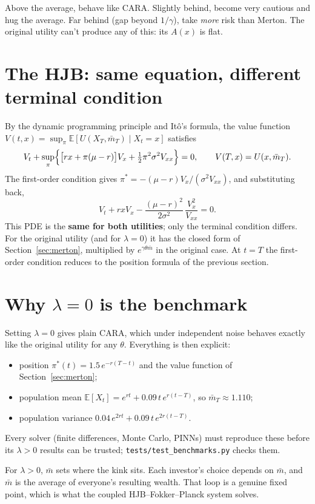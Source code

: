 \documentclass[11pt]{article}
\newcommand{\E}{\mathbb{E}}
\newcommand{\mb}{\bar m}
\begin{document}
\begin{keyidea}
Above the average, behave like CARA. Slightly behind, become very cautious and hug the
average. Far behind (gap beyond $1/\gamma$), take \emph{more} risk than Merton. The
original utility can't produce any of this: its $A(x)$ is flat.
\end{keyidea}

\section{The HJB: same equation, different terminal condition}

By the dynamic programming principle and It\^o's formula, the value function
$V(t,x)=\sup_\pi\E[U(X_T,\mb_T)\mid X_t=x]$ satisfies
\[
  V_t + \sup_\pi\Bigl\{\bigl[rx+\pi(\mu-r)\bigr]V_x + \tfrac12\pi^2\sigma^2V_{xx}\Bigr\} = 0,
  \qquad V(T,x) = U(x,\mb_T).
\]
The first-order condition gives $\pi^* = -(\mu-r)V_x/(\sigma^2V_{xx})$, and substituting back,
\[
  V_t + rxV_x - \frac{(\mu-r)^2}{2\sigma^2}\,\frac{V_x^2}{V_{xx}} = 0 .
\]
This PDE is the \textbf{same for both utilities}; only the terminal condition differs. For
the original utility (and for $\lambda=0$) it has the closed form of
Section~\ref{sec:merton}, multiplied by $e^{\gamma\theta\mb}$ in the original case. At
$t=T$ the first-order condition reduces to the position formula of the previous section.

\section{Why $\lambda=0$ is the benchmark}

Setting $\lambda=0$ gives plain CARA, which under independent noise behaves exactly like the
original utility for any $\theta$. Everything is then explicit:
\begin{itemize}
  \item position $\pi^*(t)=1.5\,e^{-r(T-t)}$ and the value function of
        Section~\ref{sec:merton};
  \item population mean $\E[X_t]=e^{rt}+0.09\,t\,e^{r(t-T)}$, so $\mb_T\approx1.110$;
  \item population variance $0.04\,e^{2rt}+0.09\,t\,e^{2r(t-T)}$.
\end{itemize}
Every solver (finite differences, Monte Carlo, PINNs) must reproduce these before its
$\lambda>0$ results can be trusted; \texttt{tests/test\_benchmarks.py} checks them.

For $\lambda>0$, $\mb$ sets where the kink sits. Each investor's choice depends on $\mb$,
and $\mb$ is the average of everyone's resulting wealth. That loop is a genuine fixed point,
which is what the coupled HJB--Fokker--Planck system solves.
\end{document}
